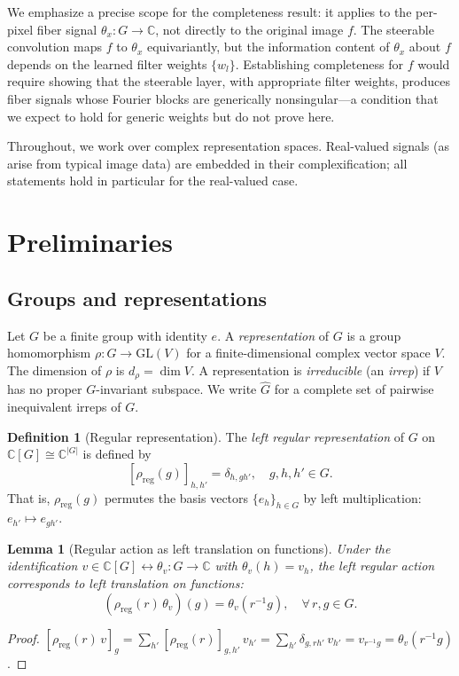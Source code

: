 \documentclass{article}
\newtheorem{lemma}[theorem]{Lemma}
\theoremstyle{definition}
\newtheorem{definition}[theorem]{Definition}
\theoremstyle{remark}
\newcommand{\C}{\mathbb{C}}
\newcommand{\Ghat}{\widehat{G}}
\begin{document}
We emphasize a precise scope for the completeness result: it applies to the per-pixel fiber signal $\theta_x : G \to \C$, not directly to the original image $f$. The steerable convolution maps $f$ to $\theta_x$ equivariantly, but the information content of $\theta_x$ about $f$ depends on the learned filter weights $\{w_l\}$. Establishing completeness for $f$ would require showing that the steerable layer, with appropriate filter weights, produces fiber signals whose Fourier blocks are generically nonsingular---a condition that we expect to hold for generic weights but do not prove here.

Throughout, we work over complex representation spaces. Real-valued signals (as arise from typical image data) are embedded in their complexification; all statements hold in particular for the real-valued case.

\section{Preliminaries}

\subsection{Groups and representations}

Let $G$ be a finite group with identity $e$. A \textit{representation} of $G$ is a group homomorphism $\rho : G \to \mathrm{GL}(V)$ for a finite-dimensional complex vector space $V$. The dimension of $\rho$ is $d_\rho = \dim V$. A representation is \textit{irreducible} (an \textit{irrep}) if $V$ has no proper $G$-invariant subspace. We write $\Ghat$ for a complete set of pairwise inequivalent irreps of $G$.

\begin{definition}[Regular representation]
The \textit{left regular representation} of $G$ on $\C[G] \cong \C^{|G|}$ is defined by
\[
[\rho_{\mathrm{reg}}(g)]_{h,h'} = \delta_{h, g h'}, \quad g, h, h' \in G.
\]
That is, $\rho_{\mathrm{reg}}(g)$ permutes the basis vectors $\{e_h\}_{h \in G}$ by left multiplication: $e_{h'} \mapsto e_{gh'}$.
\end{definition}

\begin{lemma}[Regular action as left translation on functions]\label{lem:reg_as_translation}
Under the identification $v \in \C[G] \leftrightarrow \theta_v : G \to \C$ with $\theta_v(h) = v_h$, the left regular action corresponds to left translation on functions:
\[
(\rho_{\mathrm{reg}}(r)\, \theta_v)(g) = \theta_v(r^{-1}g), \quad \forall\, r, g \in G.
\]
\end{lemma}
\begin{proof}
$[\rho_{\mathrm{reg}}(r)\, v]_g = \sum_{h'} [\rho_{\mathrm{reg}}(r)]_{g,h'}\, v_{h'} = \sum_{h'} \delta_{g, rh'}\, v_{h'} = v_{r^{-1}g} = \theta_v(r^{-1}g)$.
\end{proof}
\end{document}
